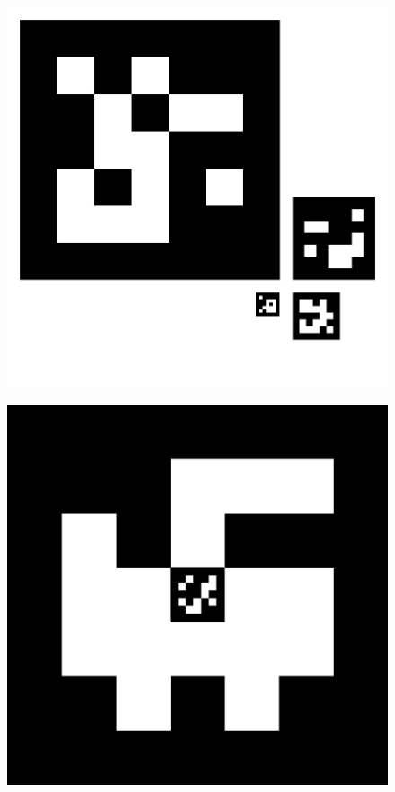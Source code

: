 \begin{figure}[ht]
\centering
	\begin{minipage}{.5\textwidth}
	  \centering
	  \includegraphics[width=.8\linewidth]{img/ArUco_recursive.jpg}
	  \label{fig:ArUco_recursive}
	\end{minipage}%
	\begin{minipage}{.5\textwidth}
	  \centering
	  \includegraphics[width=.8\linewidth]{img/ArUco_pixel_replacement.png}
	  \label{fig:ArUco_pixel_replacement}
	\end{minipage}
\end{figure}


